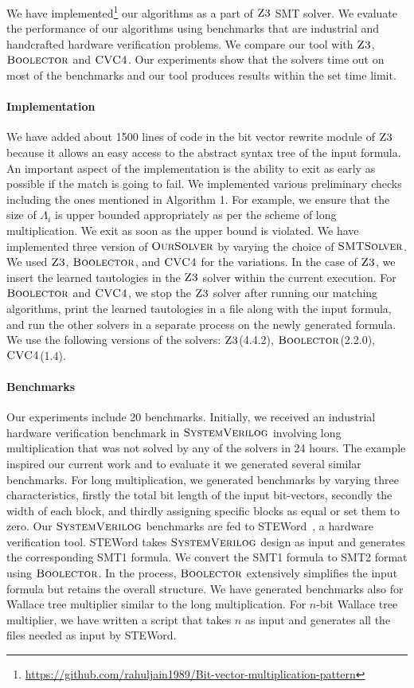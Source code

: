 %
We have implemented\footnote{\url{https://github.com/rahuljain1989/Bit-vector-multiplication-pattern}} our algorithms as a part of $\textsc{Z3}$ SMT solver.
%
 We evaluate the performance of our algorithms using benchmarks that are industrial and handcrafted hardware verification problems.
%
We compare our tool with $\textsc{Z3}$, $\textsc{Boolector}$ and $\textsc{CVC4}$.
%
Our experiments show that the solvers time out on most of the benchmarks and our tool produces results within the set time limit.

\paragraph{\bf Implementation}
We have added about 1500 lines of code in the bit vector rewrite module of $\textsc{Z3}$ because it allows an easy access to the abstract syntax tree of the input formula.
%
An important aspect of the implementation is the ability to exit as early as possible if the match is going to fail.
%
We implemented various preliminary checks including the ones mentioned in Algorithm 1. For example, we ensure that the size of $\Lambda_i$ is upper bounded appropriately as per the scheme of long multiplication. We exit as soon as the upper bound is violated. 
%
We have implemented three version of $\textsc{OurSolver}$ by varying the choice of $\textsc{SMTSolver}$.
%
We used  $\textsc{Z3}$, $\textsc{Boolector}$, and $\textsc{CVC4}$ for the variations. 
%
In the case of $\textsc{Z3}$,
we insert the learned tautologies in the $\textsc{Z3}$ solver within the current execution.
%
For $\textsc{Boolector}$ and $\textsc{CVC4}$,
we stop the $\textsc{Z3}$ solver after running our matching algorithms,
print the learned tautologies in a file along with the input formula, and
run the other solvers in a separate process on the newly generated formula. We use the following versions of the solvers: $\textsc{Z3}$(4.4.2), $\textsc{Boolector}$(2.2.0), $\textsc{CVC4}$(1.4).

\paragraph{\bf Benchmarks}
%
Our experiments include 20 benchmarks.
%
Initially, we received an industrial hardware verification benchmark
in $\textsc{SystemVerilog}$ involving long multiplication that was not solved by any
of the solvers in 24 hours.
%
The example inspired our current work and to evaluate it we generated several similar benchmarks.
%
For long multiplication, we generated benchmarks by varying three characteristics, firstly the total bit length of the input bit-vectors, secondly the width of each block, and thirdly assigning specific blocks as equal or set them to zero.
%
Our $\textsc{SystemVerilog}$ benchmarks are fed to STEWord~\cite{wste}, a hardware verification tool.
%
STEWord takes $\textsc{SystemVerilog}$ design as input and generates the corresponding SMT1 formula.
%
We convert the SMT1 formula to SMT2 format using $\textsc{Boolector}$.
%
In the process, $\textsc{Boolector}$ extensively simplifies the input formula but retains the overall structure.
%
We have generated benchmarks also for Wallace tree multiplier similar to the long multiplication.
%
For $n$-bit Wallace tree multiplier, we have written a script that takes $n$ as input and generates all the files needed as input by STEWord.
%


